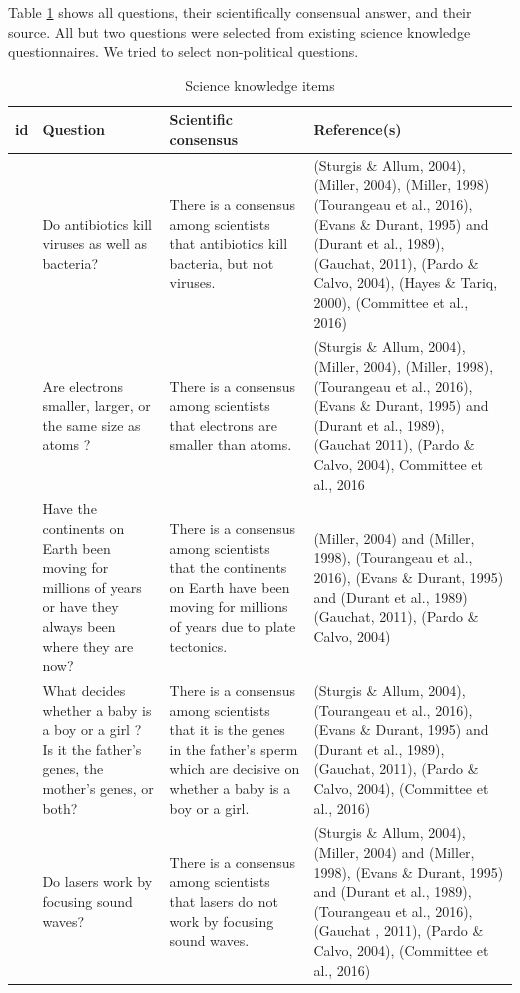 \documentclass[
  doc,floatsintext]{apa6}
\begin{document}
Table \ref{tab:knowledge} shows all questions, their scientifically consensual answer, and their source. All but two questions were selected from existing science knowledge questionnaires. We tried to select non-political questions.

\begin{longtable}[t]{>{\raggedleft\arraybackslash}p{1em}>{\raggedright\arraybackslash}p{10em}>{\raggedright\arraybackslash}p{10em}>{\raggedright\arraybackslash}p{15em}}
\caption{\label{tab:knowledge}Science knowledge items}\\
\toprule
id & Question & Scientific consensus & Reference(s)\\
\midrule
1 & Do antibiotics kill viruses as well as bacteria? & There is a consensus among scientists that antibiotics kill bacteria, but not viruses. & (Sturgis \& Allum, 2004), (Miller, 2004), (Miller, 1998) (Tourangeau et al., 2016), (Evans \& Durant, 1995) and (Durant et al., 1989), (Gauchat, 2011), (Pardo \& Calvo, 2004), (Hayes \& Tariq, 2000), (Committee et al., 2016)\\
2 & Are electrons smaller, larger, or the same size as atoms ? & There is a consensus among scientists that electrons are smaller than atoms. & (Sturgis \& Allum, 2004), (Miller, 2004), (Miller, 1998), (Tourangeau et al., 2016), (Evans \& Durant, 1995) and (Durant et al., 1989), (Gauchat 2011), (Pardo \& Calvo, 2004), Committee et al., 2016\\
3 & Have the continents on Earth been moving for millions of years or have they always been where they are now? & There is a consensus among scientists that the continents on Earth have been moving for millions of years due to plate tectonics. & (Miller, 2004) and (Miller, 1998), (Tourangeau et al., 2016), (Evans \& Durant, 1995) and (Durant et al., 1989)
(Gauchat, 2011), (Pardo \& Calvo, 2004)\\
4 & What decides whether a baby is a boy or a girl ? Is it the father’s genes, the mother’s genes, or both? & There is a consensus among scientists that it is the genes in the father's sperm which are decisive on whether a baby is a boy or a girl. & (Sturgis \& Allum, 2004), (Tourangeau et al., 2016), (Evans \& Durant, 1995) and (Durant et al., 1989), (Gauchat, 2011), (Pardo \& Calvo, 2004), (Committee et al., 2016)\\
5 & Do lasers work by focusing sound waves? & There is a consensus among scientists that lasers do not work by focusing sound waves. & (Sturgis \& Allum, 2004), (Miller, 2004) and (Miller, 1998), (Evans \& Durant, 1995) and (Durant et al., 1989), (Tourangeau et al., 2016), (Gauchat , 2011), (Pardo \& Calvo, 2004), (Committee et al., 2016)\\

\end{longtable}
\end{document}
